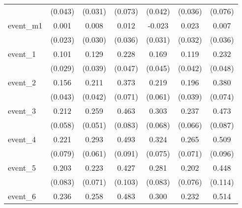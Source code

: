 {\begin{tabular}{l*{6}{c}}
            &     (0.043)         &     (0.031)         &     (0.073)         &     (0.042)         &     (0.036)         &     (0.076)         \\
[1em]
event\_m1    &       0.001         &       0.008         &       0.012         &      -0.023         &       0.023         &       0.007         \\
            &     (0.023)         &     (0.030)         &     (0.036)         &     (0.031)         &     (0.032)         &     (0.036)         \\
[1em]
event\_1     &       0.101\sym{***}&       0.129\sym{**} &       0.228\sym{***}&       0.169\sym{***}&       0.119\sym{**} &       0.232\sym{***}\\
            &     (0.029)         &     (0.039)         &     (0.047)         &     (0.045)         &     (0.042)         &     (0.048)         \\
[1em]
event\_2     &       0.156\sym{***}&       0.211\sym{***}&       0.373\sym{***}&       0.219\sym{***}&       0.196\sym{***}&       0.380\sym{***}\\
            &     (0.043)         &     (0.042)         &     (0.071)         &     (0.061)         &     (0.039)         &     (0.074)         \\
[1em]
event\_3     &       0.212\sym{***}&       0.259\sym{***}&       0.463\sym{***}&       0.303\sym{***}&       0.237\sym{***}&       0.473\sym{***}\\
            &     (0.058)         &     (0.051)         &     (0.083)         &     (0.068)         &     (0.066)         &     (0.087)         \\
[1em]
event\_4     &       0.221\sym{**} &       0.293\sym{***}&       0.493\sym{***}&       0.324\sym{***}&       0.265\sym{***}&       0.509\sym{***}\\
            &     (0.079)         &     (0.061)         &     (0.091)         &     (0.075)         &     (0.071)         &     (0.096)         \\
[1em]
event\_5     &       0.203\sym{*}  &       0.223\sym{**} &       0.427\sym{***}&       0.281\sym{***}&       0.202\sym{**} &       0.448\sym{***}\\
            &     (0.083)         &     (0.071)         &     (0.103)         &     (0.083)         &     (0.076)         &     (0.114)         \\
[1em]
event\_6     &       0.236\sym{**} &       0.258\sym{**} &       0.483\sym{***}&       0.300\sym{***}&       0.232\sym{**} &       0.514\sym{***}\\

\end{tabular}}
